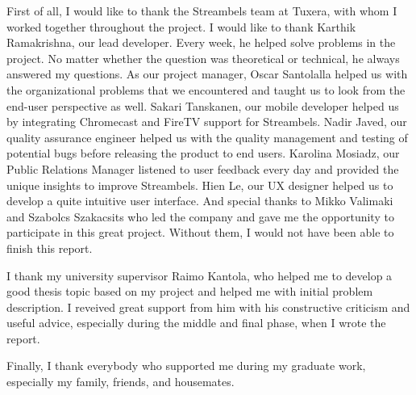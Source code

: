 
First of all, I would like to thank the Streambels team at Tuxera, with whom I worked
together throughout the project. I would like to thank Karthik Ramakrishna, our
lead developer. Every week, he helped solve problems in the project.
No matter whether the question was theoretical or technical, he always answered my
questions. As our project manager, Oscar Santolalla helped us with
the organizational problems that we encountered and taught us to look from the
end-user perspective as well. Sakari Tanskanen, our mobile developer helped us
by integrating Chromecast and FireTV support for Streambels. Nadir Javed, our
quality assurance engineer helped us with the quality management and testing of
potential bugs before releasing the product to end users. Karolina Mosiadz, our
Public Relations Manager listened to user feedback every day and provided the unique
insights to improve Streambels. Hien Le, our UX designer helped us to develop
a quite intuitive user interface. And special thanks to Mikko Valimaki and Szabolcs
Szakacsits who led the company and gave me the opportunity to participate in
this great project. Without them, I would not have been able to finish this
report.

I thank my university supervisor Raimo Kantola, who helped me to develop a good
thesis topic based on my project and helped me with initial problem description.
I reveived great support from him with his constructive criticism and useful advice, especially
during the middle and final phase, when I wrote the report.

Finally, I thank everybody who supported me during my graduate work,
especially my family, friends, and housemates.